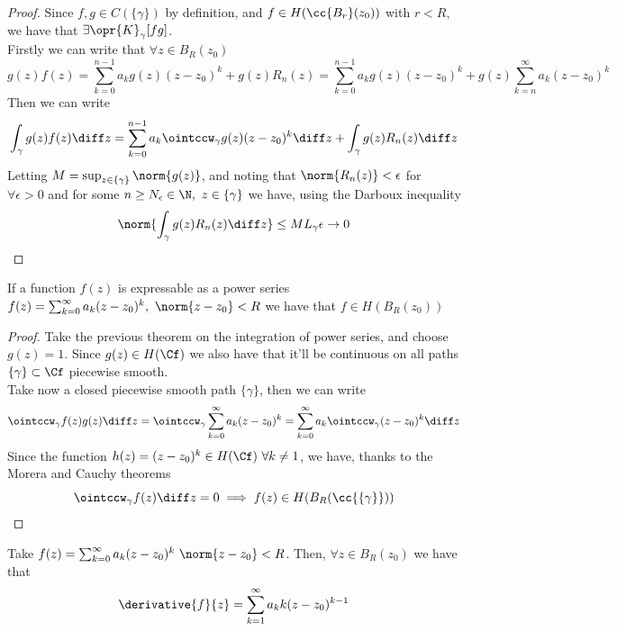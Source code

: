 \documentclass[../mmf.tex]{subfiles}
\begin{document}
\begin{proof}
	Since $f,g\in C(\{\gamma\})$ by definition, and $f\in H(\cc{B_r}(z_0))$ with $r<R$, we have that $\exists\opr{K}_\gamma[fg]$.\\
	Firstly we can write that $\forall z\in B_R(z_0)$
	\begin{equation*}
		g(z)f(z)=\sum_{k=0}^{n-1}a_kg(z)(z-z_0)^k+g(z)R_n(z)=\sum_{k=0}^{n-1}a_kg(z)(z-z_0)^k+g(z)\sum_{k=n}^\infty a_k(z-z_0)^k
	\end{equation*}
	Then we can write
	\begin{equation*}
		\int_{\gamma}^{}g(z)f(z)\diff z=\sum_{k=0}^{n-1}a_k\ointccw_\gamma g(z)(z-z_0)^k\diff z+\int_{\gamma}^{}g(z)R_n(z)\diff z
	\end{equation*}
	Letting $M=\sup_{z\in\{\gamma\}}\norm{g(z)}$, and noting that $\norm{R_n(z)}<\epsilon$ for $\forall\epsilon>0$ and for some $n\ge N_\epsilon\in\N,\ z\in\{\gamma\}$ we have, using the Darboux inequality
	\begin{equation*}
		\norm{\int_{\gamma}^{}g(z)R_n(z)\diff z}\le ML_\gamma\epsilon\to0
	\end{equation*}
\end{proof}
\begin{thm}
	If a function $f(z)$ is expressable as a power series $f(z)=\sum_{k=0}^\infty a_k(z-z_0)^k,\ \norm{z-z_0}<R$ we have that $f\in H(B_R(z_0))$
\end{thm}
\begin{proof}
	Take the previous theorem on the integration of power series, and choose $g(z)=1$. Since $g(z)\in H(\Cf)$ we also have that it'll be continuous on all paths $\{\gamma\}\subset\Cf$ piecewise smooth.\\
	Take now a closed piecewise smooth path $\{\gamma\}$, then we can write
	\begin{equation*}
		\ointccw_\gamma f(z)g(z)\diff z=\ointccw_\gamma\sum_{k=0}^\infty a_k(z-z_0)^k=\sum_{k=0}^\infty a_k\ointccw_\gamma(z-z_0)^k\diff z
	\end{equation*}
	Since the function $h(z)=(z-z_0)^k\in H(\Cf)\ \forall k\ne1$, we have, thanks to the Morera and Cauchy theorems
	\begin{equation*}
		\ointccw_\gamma f(z)\diff z=0\implies{} f(z)\in H(B_R(\cc{\{\gamma\}}))
	\end{equation*}
\end{proof}
\begin{cor}
	Take $f(z)=\sum_{k=0}^\infty a_k(z-z_0)^k\ \norm{z-z_0}<R$. Then, $\forall z\in B_R(z_0)$ we have that
	\begin{equation}
		\derivative{f}{z}=\sum_{k=1}^\infty a_kk(z-z_0)^{k-1}
		\label{eq:derivativeps2}
	\end{equation}
\end{cor}
\end{document}
